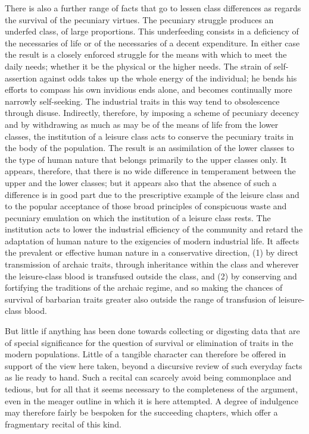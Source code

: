 \documentclass[12pt]{report}
\begin{document}
There is also a further range of facts that go to lessen class
differences as regards the survival of the pecuniary virtues. The
pecuniary struggle produces an underfed class, of large proportions.
This underfeeding consists in a deficiency of the necessaries of life or
of the necessaries of a decent expenditure. In either case the result is
a closely enforced struggle for the means with which to meet the daily
needs; whether it be the physical or the higher needs. The strain of
self-assertion against odds takes up the whole energy of the individual;
he bends his efforts to compass his own invidious ends alone, and
becomes continually more narrowly self-seeking. The industrial traits in
this way tend to obsolescence through disuse. Indirectly, therefore, by
imposing a scheme of pecuniary decency and by withdrawing as much as
may be of the means of life from the lower classes, the institution of
a leisure class acts to conserve the pecuniary traits in the body of the
population. The result is an assimilation of the lower classes to the
type of human nature that belongs primarily to the upper classes only.
It appears, therefore, that there is no wide difference in temperament
between the upper and the lower classes; but it appears also that the
absence of such a difference is in good part due to the prescriptive
example of the leisure class and to the popular acceptance of those
broad principles of conspicuous waste and pecuniary emulation on which
the institution of a leisure class rests. The institution acts to lower
the industrial efficiency of the community and retard the adaptation of
human nature to the exigencies of modern industrial life. It affects the
prevalent or effective human nature in a conservative direction, (1) by
direct transmission of archaic traits, through inheritance within the
class and wherever the leisure-class blood is transfused outside the
class, and (2) by conserving and fortifying the traditions of the
archaic regime, and so making the chances of survival of barbarian
traits greater also outside the range of transfusion of leisure-class
blood.

But little if anything has been done towards collecting or digesting
data that are of special significance for the question of survival or
elimination of traits in the modern populations. Little of a tangible
character can therefore be offered in support of the view here taken,
beyond a discursive review of such everyday facts as lie ready to hand.
Such a recital can scarcely avoid being commonplace and tedious, but for
all that it seems necessary to the completeness of the argument, even in
the meager outline in which it is here attempted. A degree of indulgence
may therefore fairly be bespoken for the succeeding chapters, which
offer a fragmentary recital of this kind.
\end{document}
